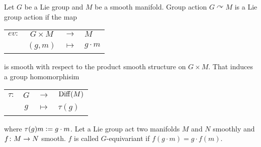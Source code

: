 \documentclass[a4paper,12pt]{article}
\begin{document}
	Let $G$ be a Lie group and $M$ be a smooth manifold. Group action $G \curvearrowright M$ is a Lie group action if the map
	\begin{center}
		\begin{tabular}{l c c l}
			$ev \colon$ & $G \times M$ & $\longrightarrow$ & $M$ \\
			~ & $(g,m)$ & $\longmapsto$ & $g\cdot m$
		\end{tabular}
	\end{center}
	is smooth with respect to the product smooth structure on $G \times M$. That induces a group homomorphisim 
	\begin{center}
		\begin{tabular}{l c c l}
			$\tau \colon$ & $G$ & $\longrightarrow$ & $\operatorname{Diff}(M)$ \\
			~ & $g$ & $\longmapsto$ & $\tau(g)$
		\end{tabular}
	\end{center}
	where $\tau(g)m \vcentcolon= g \cdot m$. Let a Lie group act two manifolds $M$ and $N$ smoothly and $f \colon M \rightarrow N$ smooth. $f$ is called $G$-equivariant if $f(g\cdot m) = g\cdot f(m)$.
\end{document}

